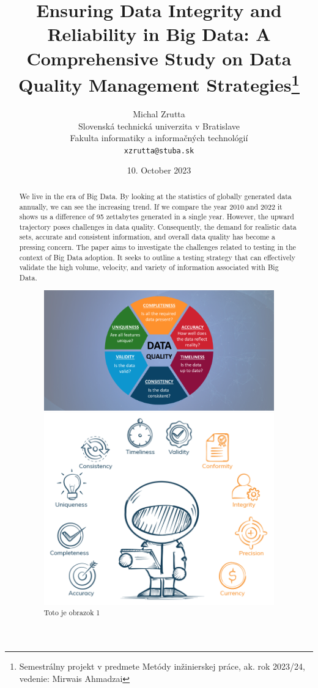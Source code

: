 \documentclass[12pt,twocolumn,twoside,a4paper]{article}
\title{Ensuring Data Integrity and Reliability in Big Data: A Comprehensive Study on Data Quality Management Strategies\thanks{Semestrálny projekt v predmete Metódy inžinierskej práce, ak. rok 2023/24, vedenie: Mirwais Ahmadzai}}
\author{Michal Zrutta \\[2pt]
	{\small Slovenská technická univerzita v Bratislave}\\
	{\small Fakulta informatiky a informačných technológií}\\
	{\small \texttt{xzrutta@stuba.sk}}
}
\date{\small 10. October 2023}
\begin{document}
\maketitle

\begin{abstract}
We live in the era of Big Data. By looking at the statistics of globally generated data annually, we can 
see the increasing trend. If we compare the year 2010 and 2022 it shows us a difference of 95
zettabytes generated in a single year. However, the upward trajectory poses challenges in data 
quality. Consequently, the demand for realistic data sets, accurate and consistent information, and 
overall data quality has become a pressing concern. The paper aims to investigate the challenges 
related to testing in the context of Big Data adoption. It seeks to outline a testing strategy that can 
effectively validate the high volume, velocity, and variety of information associated with Big Data.\cite{gudivada2015big}\cite{mittal2013trustworthiness}
\begin{figure}[htbp]
  \centering
  \begin{minipage}[b]{0.5\textwidth}
   \centering
    \includegraphics[width=\textwidth]{data1.png}
    \caption{Toto je obrazok 1}
    \label{fig:image1}
  \end{minipage}
  \begin{minipage}[b]{0.5\textwidth}
    \centering
    \includegraphics[width=\textwidth]{data2.png}

\end{minipage}
\end{figure}
\end{abstract}
\end{document}
